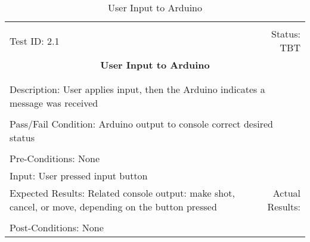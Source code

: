 \documentclass[titlepage]{article}
\begin{document}
\begin{center}%
\begin{table}
\begin{tabular}{|l r|}\hline&\\[-2mm]
	Test ID: 2.1	&Status: TBT\\[-3mm]
	\multicolumn{2}{|c|}{\textbf{\large{User Input to Arduino}}}\\&\\\hline&\\[-3mm]
	\multicolumn{2}{|p{\textwidth}|}{Description: User applies input, then the Arduino indicates a message was received}\\[1mm]\hline&\\[-3mm]
	\multicolumn{2}{|p{\textwidth}|}{Pass/Fail Condition: Arduino output to console correct desired status}\\[1mm]\hline&\\[-3mm]
	\multicolumn{2}{|p{\textwidth}|}{Pre-Conditions: None}\\[4mm]
	\multicolumn{2}{|p{\textwidth}|}{Input: User pressed input button}\\[2mm]\hline
	\multicolumn{1}{|p{0.49\textwidth}}{Expected Results: Related console output: make shot, cancel, or move, depending on the button pressed}	&\multicolumn{1}{|p{0.45\textwidth}|}{Actual Results:}\\\hline&\\[-3mm]
	\multicolumn{2}{|p{\textwidth}|}{Post-Conditions: None}\\\hline
\end{tabular}
\caption{User Input to Arduino}
\end{table}
\end{center}
\end{document}
